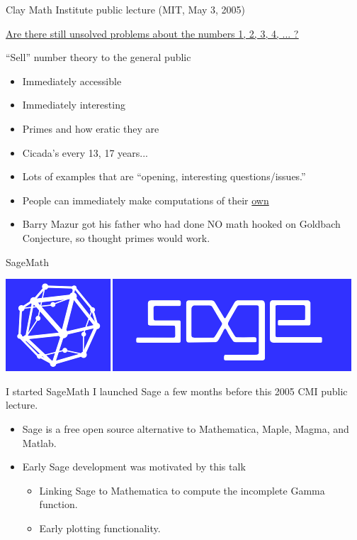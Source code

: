 \documentclass{beamer}
\begin{document}
\begin{frame}{Clay Math Institute public lecture (MIT, May 3, 2005)}

  \href{http://www.claymath.org/library/public\_lectures/mazur\_riemann\_hypothesis.pdf}{\underline{Are there still unsolved problems about the numbers 1, 2, 3, 4, ... ?}}
  \vfill

  \begin{block}{``Sell'' number theory to the general public}
    \begin{itemize}
      \item   Immediately accessible
      \item   Immediately interesting
      \item   Primes and how eratic they are
      \item   Cicada's every 13, 17 years...
      \item   Lots of examples that are ``opening, interesting questions/issues.''
      \item   People can immediately make computations of their \underline{own}
      \item   Barry Mazur got his father who had done NO
            math hooked on Goldbach Conjecture, so thought
            primes would work.
    \end{itemize}
  \end{block}
\end{frame}

\begin{frame}{SageMath}
  \vfill
  \begin{center}
    \includegraphics[width=.7\textwidth]{pics/sage-logo.png}
  \end{center}
  \vfill

  \begin{block}{I started SageMath}
    I launched Sage a few months before this 2005 CMI public lecture.
    \begin{itemize}
      \item Sage is a free open source alternative to Mathematica, Maple, Magma, and Matlab.
      \item Early Sage development was motivated by this talk
            \begin{itemize}
              \item Linking Sage to Mathematica to compute the incomplete Gamma function.
              \item Early plotting functionality.
            \end{itemize}
    \end{itemize}
  \end{block}
\end{frame}
\end{document}
